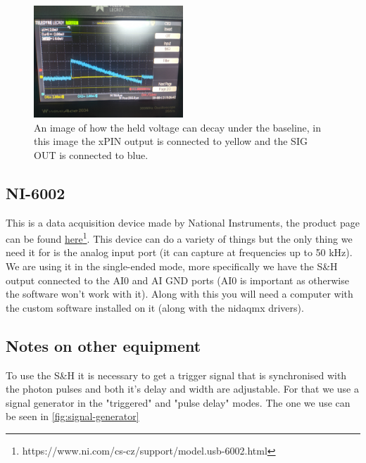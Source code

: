 \documentclass[a4paper, 10pt]{article}
\begin{document}
\begin{figure}[H]
    \centering
    \includegraphics[width=0.5\textwidth]{./images/sample-hold-decay-2.jpg}
    \caption{An image of how the held voltage can decay under the baseline, in this image the xPIN output is connected to yellow and the SIG OUT is connected to blue.}
    \label{fig:sample-hold-decay-2}
\end{figure}

\subsection{NI-6002} \label{subsec:sample-hold}
This is a data acquisition device made by National Instruments, the product page can be found \href{https://www.ni.com/cs-cz/support/model.usb-6002.html}{here}\footnote{https://www.ni.com/cs-cz/support/model.usb-6002.html}.
This device can do a variety of things but the only thing we need it for is the analog input port (it can capture at frequencies up to 50 \si{\kilo\hertz}).
We are using it in the single-ended mode, more specifically we have the S\&H output connected to the AI0 and AI GND ports (AI0 is important as otherwise the software won't work with it).
Along with this you will need a computer with the custom software installed on it (along with the nidaqmx drivers).

\subsection{Notes on other equipment}
To use the S\&H it is necessary to get a trigger signal that is synchronised with the photon pulses and both it's delay and width are adjustable.
For that we use a signal generator in the "triggered" and "pulse delay" modes.
The one we use can be seen in \cref{fig:signal-generator}
\end{document}
